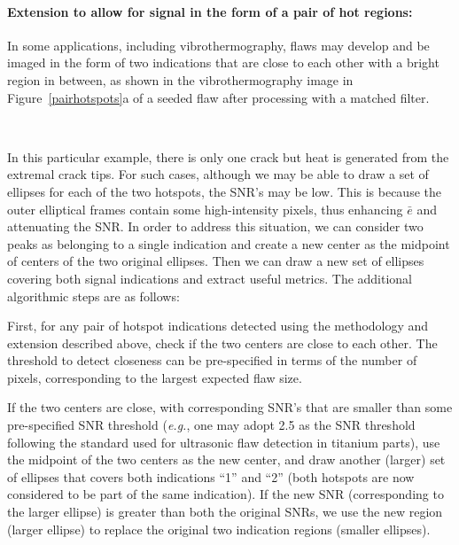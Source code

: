\documentclass[12pt]{article}
\newenvironment{packed_enum}{
\begin{enumerate}[leftmargin=1.2em]
  \setlength{\itemsep}{1pt}
  \setlength{\parskip}{0pt}
  \setlength{\parsep}{0pt}
}{\end{enumerate}}
\begin{document}
\paragraph{Extension to allow for signal in the form of a pair of hot
  regions:}
In some applications, including vibrothermography, flaws may develop
and be imaged in the form of two indications that are close to
each other with a bright region in between, as shown in the
vibrothermography image in Figure~\ref{pairhotspots}a of a 
seeded flaw after processing with a matched filter.
\begin{figure*}[h]
\mbox{
    }
\caption{(a) Processed vibrothermography image with two hot tips in
  one indication region and illustration of (b) algorithm for   detecting
  multiple hotspots and (c) its extension for deducing that  
  the two hotspots are in reality from one signal souce.}
\label{pairhotspots}
\vspace{-0.1in}
\end{figure*}
In this particular example, there is only one crack but heat is
generated from the extremal crack tips.
For such cases, although we may be  able to draw a set of
ellipses for each of the two hotspots, the SNR's may be low. This is
because the outer elliptical frames contain some high-intensity
pixels, thus enhancing $\bar e$ and attenuating the SNR. In order to
address this situation, we can consider two peaks as belonging  to a
single indication and create a new center as the midpoint of centers
of the two original ellipses. Then we can draw a new set of ellipses covering
both signal indications and extract useful metrics. The additional 
algorithmic steps are as follows:
\begin{packed_enum}
\item
 First, for any pair of hotspot indications detected using the
 methodology and extension described above, check if the two
 centers are close to each other.  The threshold to detect
 closeness can be pre-specified in terms of 
 the  number of pixels, corresponding to  the largest expected
 flaw  size. 
\item
 If the two centers are  close, with corresponding SNR's that are
 smaller than some pre-specified SNR threshold ({\em e.g.}, one 
 may adopt 2.5 as the SNR threshold following the  standard used for
 ultrasonic flaw detection in titanium parts), use the
 midpoint of the two   centers as the new center, and draw another
 (larger) set of ellipses that covers  both indications ``1'' and ``2''
 (both hotspots are now considered to be part of the same
 indication). If the new SNR (corresponding to the larger ellipse) is
 greater than both the original SNRs, we use  the new region (larger
 ellipse) to replace the original two indication regions (smaller
 ellipses). 
\end{packed_enum}
\end{document}
